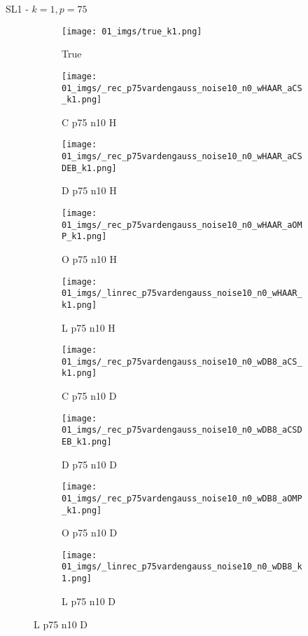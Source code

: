 \begin{frame}{SL1 - $k=1,p=75$}{}
\begin{figure}
\begin{subfigure}{0.1\textwidth}
\texttt{[image: 01\_imgs/true\_k1.png]}
\caption*{\Tiny True}
\end{subfigure}
\begin{subfigure}{0.1\textwidth}
\texttt{[image: 01\_imgs/\_rec\_p75vardengauss\_noise10\_n0\_wHAAR\_aCS\_k1.png]}
\caption*{\Tiny C p75 n10 H}
\end{subfigure}
\begin{subfigure}{0.1\textwidth}
\texttt{[image: 01\_imgs/\_rec\_p75vardengauss\_noise10\_n0\_wHAAR\_aCSDEB\_k1.png]}
\caption*{\Tiny D p75 n10 H}
\end{subfigure}
\begin{subfigure}{0.1\textwidth}
\texttt{[image: 01\_imgs/\_rec\_p75vardengauss\_noise10\_n0\_wHAAR\_aOMP\_k1.png]}
\caption*{\Tiny O p75 n10 H}
\end{subfigure}
\begin{subfigure}{0.1\textwidth}
\texttt{[image: 01\_imgs/\_linrec\_p75vardengauss\_noise10\_n0\_wHAAR\_k1.png]}
\caption*{\Tiny L p75 n10 H}
\end{subfigure}
\begin{subfigure}{0.1\textwidth}
\texttt{[image: 01\_imgs/\_rec\_p75vardengauss\_noise10\_n0\_wDB8\_aCS\_k1.png]}
\caption*{\Tiny C p75 n10 D}
\end{subfigure}
\begin{subfigure}{0.1\textwidth}
\texttt{[image: 01\_imgs/\_rec\_p75vardengauss\_noise10\_n0\_wDB8\_aCSDEB\_k1.png]}
\caption*{\Tiny D p75 n10 D}
\end{subfigure}
\begin{subfigure}{0.1\textwidth}
\texttt{[image: 01\_imgs/\_rec\_p75vardengauss\_noise10\_n0\_wDB8\_aOMP\_k1.png]}
\caption*{\Tiny O p75 n10 D}
\end{subfigure}
\begin{subfigure}{0.1\textwidth}
\texttt{[image: 01\_imgs/\_linrec\_p75vardengauss\_noise10\_n0\_wDB8\_k1.png]}
\caption*{\Tiny L p75 n10 D}
\end{subfigure}

\vspace{5pt}


\end{figure}
\end{frame}
